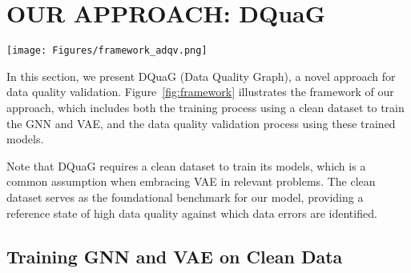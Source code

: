 \section{OUR APPROACH: DQuaG}

\begin{figure*}[tb]
\centering
\texttt{[image: Figures/framework\_adqv.png]}
\vspace{-0.6\baselineskip}
\caption{Data Quality Validation Framework Using GNN and VAE. Top: Training on clean data for Approach Establishment. Bottom: Validating unseen datasets by reconstruction error comparison.}
\vspace*{-0.3cm}
\label{fig:framework}
\end{figure*}



In this section, we present DQuaG (Data Quality Graph), a novel approach for data quality validation. 
Figure~\ref{fig:framework} illustrates the framework of our approach, which includes both the training process using a clean dataset to train the GNN and VAE, and the data quality validation process using these trained models. 

Note that DQuaG requires a clean dataset to train its models, which is a common assumption when embracing VAE in relevant problems.
The clean dataset serves as the foundational benchmark for our model, providing a reference state of high data quality against which data errors are identified. 

\subsection{Training GNN and VAE on Clean Data}
